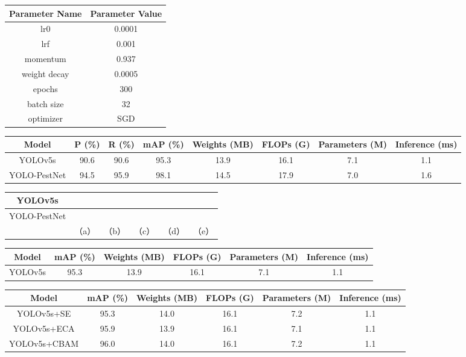 \documentclass[12pt, a4paper, twoside]{ctexart}
\begin{document}
\begin{table}[htbp]
\centering
\begin{tabular}{|c|c|}
\hline
Parameter Name & Parameter Value \\
\hline
lr0 & 0.0001 \\
\hline
lrf & 0.001 \\
\hline
momentum & 0.937 \\
\hline
weight decay & 0.0005 \\
\hline
epochs & 300 \\
\hline
batch size & 32 \\
\hline
optimizer & SGD \\
\hline
\end{tabular}
\end{table}

\begin{table}[htbp]
\centering
\begin{tabular}{|c|c|c|c|c|c|c|c|}
\hline
Model & P
(\%) & R
(\%) & mAP
(\%) & Weights
(MB) & FLOPs
(G) & Parameters
(M) & Inference
(ms) \\
\hline
YOLOv5s & 90.6 & 90.6 & 95.3 & 13.9 & 16.1 & 7.1 & 1.1 \\
\hline
YOLO-PestNet & 94.5 & 95.9 & 98.1 & 14.5 & 17.9 & 7.0 & 1.6 \\
\hline
\end{tabular}
\end{table}

\begin{table}[htbp]
\centering
\begin{tabular}{|c|c|c|c|c|c|}
\hline
YOLOv5s &  &  &  &  &  \\
\hline
YOLO-PestNet &  &  &  &  &  \\
\hline
 & （a） & （b） & （c） & （d） & （e） \\
\hline
\end{tabular}
\end{table}

\begin{table}[htbp]
\centering
\begin{tabular}{|c|c|c|c|c|c|}
\hline
Model & mAP
(\%) & Weights
(MB) & FLOPs
(G) & Parameters
(M) & Inference
(ms) \\
\hline
YOLOv5s & 95.3 & 13.9 & 16.1 & 7.1 & 1.1 \\
\hline
\end{tabular}
\end{table}

\begin{table}[htbp]
\centering
\begin{tabular}{|c|c|c|c|c|c|}
\hline
Model & mAP
(\%) & Weights
(MB) & FLOPs
(G) & Parameters
(M) & Inference
(ms) \\
\hline
YOLOv5s+SE & 95.3 & 14.0 & 16.1 & 7.2 & 1.1 \\
\hline
YOLOv5s+ECA & 95.9 & 13.9 & 16.1 & 7.1 & 1.1 \\
\hline
YOLOv5s+CBAM & 96.0 & 14.0 & 16.1 & 7.2 & 1.1 \\
\hline
\end{tabular}
\end{table}
\end{document}
